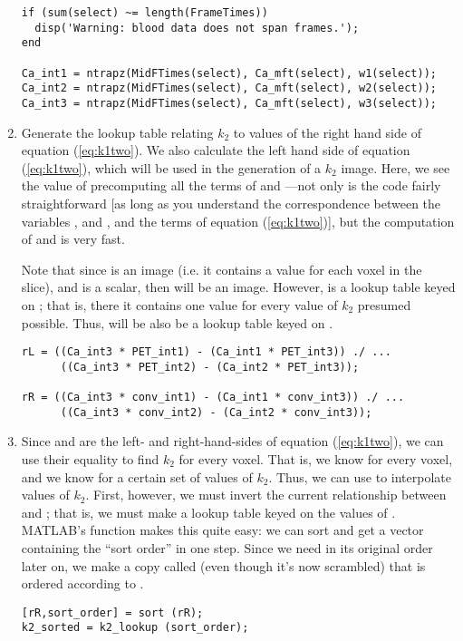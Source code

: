 \begin{enumerate}
\begin{verbatim}
if (sum(select) ~= length(FrameTimes))
  disp('Warning: blood data does not span frames.');
end
  
Ca_int1 = ntrapz(MidFTimes(select), Ca_mft(select), w1(select));
Ca_int2 = ntrapz(MidFTimes(select), Ca_mft(select), w2(select));
Ca_int3 = ntrapz(MidFTimes(select), Ca_mft(select), w3(select));
\end{verbatim}

\item Generate the lookup table relating $k_2$ to values of the right
hand side of equation (\ref{eq:k1two}).  We also calculate the left
hand side of equation (\ref{eq:k1two}), which will be used in the
generation of a $k_2$ image.  Here, we see the value of precomputing
all the terms of  and ---not only is the code fairly
straightforward [as long as you understand the correspondence between
the variables ,  and
, and the terms of equation (\ref{eq:k1two})],
but the computation of  and  is very fast.

Note that since  is an image (i.e. it contains
a value for each voxel in the slice), and  is a
scalar, then  will be an image.  However, 
 is a lookup table keyed on
; that is, there it contains one value for every
value of $k_2$ presumed possible.  Thus,  will be also be a
lookup table keyed on .
\begin{verbatim}
rL = ((Ca_int3 * PET_int1) - (Ca_int1 * PET_int3)) ./ ...
      ((Ca_int3 * PET_int2) - (Ca_int2 * PET_int3));

rR = ((Ca_int3 * conv_int1) - (Ca_int1 * conv_int3)) ./ ...
      ((Ca_int3 * conv_int2) - (Ca_int2 * conv_int3));
\end{verbatim}

\item Since  and  are the left- and right-hand-sides
  of equation (\ref{eq:k1two}), we can use their equality to find
  $k_2$ for every voxel.  That is, we know  for every voxel,
  and we know  for a certain set of values of $k_2$.  Thus,
  we can use  to interpolate values of $k_2$.  First,
  however, we must invert the current relationship between
   and ; that is, we must make
   a lookup table keyed on the values of .
  MATLAB's  function makes this quite easy: we can sort
   and get a vector containing the ``sort order'' in one
  step.  Since we need  in its original order later
  on, we make a copy called  (even though it's now
  scrambled) that is ordered according to .
\begin{verbatim}
[rR,sort_order] = sort (rR);
k2_sorted = k2_lookup (sort_order);
\end{verbatim}


\end{enumerate}
